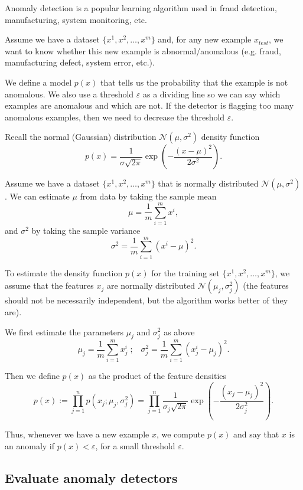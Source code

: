 \documentclass[a4paper,11pt]{report}
\newcommand{\ds}{\displaystyle}
\begin{document}
Anomaly detection is a popular learning algorithm used in fraud detection, manufacturing, system monitoring, etc.

Assume we have a dataset $\{x^1, x^2,\ldots, x^m\}$ and, for any new example $x_{test}$, we want to know whether this new example is abnormal/anomalous (e.g. fraud, manufacturing defect, system error, etc.).

We define a model $p(x)$ that tells us the probability that the example is not anomalous. We also use a threshold $\varepsilon$ as a dividing line so we can say which examples are anomalous and which are not.
If the detector is flagging too many anomalous examples, then we need to decrease the threshold $\varepsilon$.

Recall the normal (Gaussian) distribution $\mathcal{N}(\mu, \sigma^2)$ density function
$$p(x) = \dfrac{1}{\sigma\sqrt{2\pi}} \exp\left(-\dfrac{(x-\mu)^2}{2\sigma^2}\right).$$

Assume we have a dataset $\{x^1, x^2,\ldots, x^m\}$ that is normally distributed $\mathcal{N}(\mu, \sigma^2)$. We can estimate $\mu$ from data by taking the sample mean
$$\mu = \dfrac{1}{m} \ds\sum_{i=1}^{m}{x^i},$$
and $\sigma^2$ by taking the sample variance
$$\sigma^2 = \dfrac{1}{m} \ds\sum_{i=1}^{m}{(x^i - \mu)}^2.$$

To estimate the density function $p(x)$ for the training set $\{x^1, x^2,\ldots, x^m\}$, we assume that the features $x_j$ are normally distributed $\mathcal{N}(\mu_j, \sigma_j^2)$ (the features should not be necessarily independent, but the algorithm works better of they are).

We first estimate the parameters $\mu_j$ and $\sigma_j^2$ as above
$$\mu_j = \dfrac{1}{m} \ds\sum_{i=1}^{m}{x_j^i}  \; ; \;\;\;  \sigma_j^2 = \dfrac{1}{m} \ds\sum_{i=1}^{m}{(x_j^i - \mu_j)}^2.$$

Then we define $p(x)$ as the product of the feature densities
$$ p(x) := \ds\prod_{j=1}^{n}{p(x_j; \mu_j, \sigma_j^2)} = \prod_{j=1}^{n}\dfrac{1}{\sigma_j\sqrt{2\pi}} \exp\left(-\dfrac{(x_j-\mu_j)^2}{2\sigma_j^2}\right).$$

Thus, whenever we have a new example $x$, we compute $p(x)$ and say that $x$ is an anomaly if $p(x) < \varepsilon$, for a small threshold $\varepsilon$.

\subsection*{Evaluate anomaly detectors}
\end{document}
